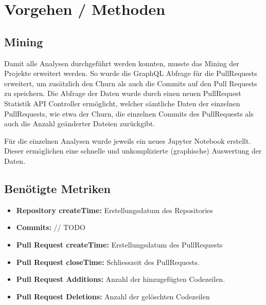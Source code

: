 


\chapter{Vorgehen / Methoden} %

\label{Chapter3} %


\section{Mining}
Damit alle Analysen durchgeführt werden konnten, musste das Mining der Projekte erweitert werden. So wurde die GraphQL Abfrage für die PullRequests erweitert, um zusätzlich den Churn als auch die Commits auf den Pull Requests zu speichern. Die Abfrage der Daten wurde durch einen neuen PullRequest Statistik API Controller ermöglicht, welcher sämtliche Daten der einzelnen PullRequests, wie etwa der Churn, die einzelnen Commits des PullRequests als auch die Anzahl geänderter Dateien zurückgibt. 

Für die einzelnen Analysen wurde jeweils ein neues Jupyter Notebook erstellt. Dieser ermöglichen eine schnelle und unkomplizierte (graphische) Auswertung der Daten. \parencite{stumpf_simon_repo-detectivesba-metric-analysis-scripts_nodate}

\section{Benötigte Metriken}
\label{sec:Metriken}
\begin{itemize}
    \item \textbf{Repository createTime:} Erstellungsdatum des Repositories
     \item \textbf{Commits:} // TODO
\end{itemize}
\begin{itemize}
    \item \textbf{Pull Request createTime:} Erstellungsdatum des PullRequests
    \item \textbf{Pull Request closeTime:} Schliesszeit des PullRequests.
    \item \textbf{Pull Request Additions:} Anzahl der hinzugefügten Codezeilen.
    \item \textbf{Pull Request Deletions:} Anzahl der gelöschten Codezeilen
\end{itemize}

